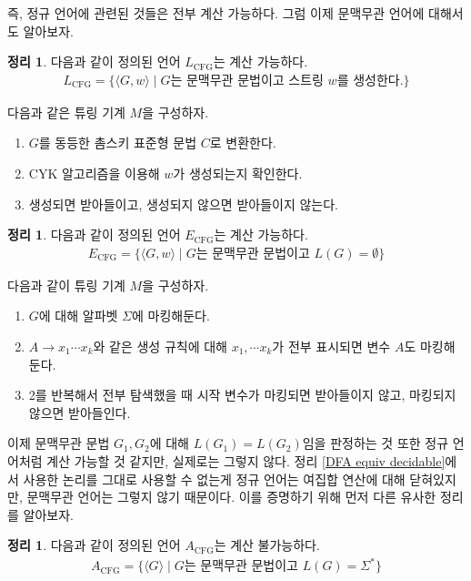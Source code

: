 \documentclass[b5paper, 10pt]{book}
\theoremstyle{definition}
\newtheorem{thm}[defn]{정리}
\newenvironment{pf*}{\pushQED{\qed}\pf}{\popQED\endpf}
\begin{document}
즉, 정규 언어에 관련된 것들은 전부 계산 가능하다. 그럼 이제 문맥무관 언어에 대해서도
알아보자.
\begin{thm}
    다음과 같이 정의된 언어 $L_{\text{CFG}}$는 계산 가능하다.
    \begin{align*}
        L_{\text{CFG}} = \{\langle G, w \rangle \;\vert\; 
        G\text{는 문맥무관 문법이고 스트링 } w\text{를 생성한다.}\}
    \end{align*}
\end{thm}
\begin{pf*}
    다음과 같은 튜링 기계 $M$을 구성하자.
    \begin{enumerate}
        \item $G$를 동등한 촘스키 표준형 문법 $C$로 변환한다.
        \item CYK 알고리즘을 이용해 $w$가 생성되는지 확인한다.
        \item 생성되면 받아들이고, 생성되지 않으면 받아들이지 않는다.
    \end{enumerate}
\end{pf*}
\begin{thm}
    다음과 같이 정의된 언어 $E_\text{CFG}$는 계산 가능하다.
    \begin{align*}
        E_{\text{CFG}} = \{\langle G, w \rangle \;\vert\; 
        G\text{는 문맥무관 문법이고 } L(G) = \emptyset\}
    \end{align*}
\end{thm}
\begin{pf*}
    다음과 같이 튜링 기계 $M$을 구성하자.
    \begin{enumerate}
        \item $G$에 대해 알파벳 $\Sigma$에 마킹해둔다. 
        \item $A \rightarrow x_1 \cdots x_k$와 같은 생성 규칙에 대해 
        $x_1, \cdots x_k$가 전부 표시되면 변수 $A$도 마킹해둔다.
        \item 2를 반복해서 전부 탐색했을 때 시작 변수가 마킹되면 받아들이지 않고, 
        마킹되지 않으면 받아들인다. 
    \end{enumerate}
\end{pf*}
이제 문맥무관 문법 $G_1, G_2$에 대해 $L(G_1) = L(G_2)$임을 판정하는 것 또한
정규 언어처럼 계산 가능할 것 같지만, 실제로는 그렇지 않다. 정리 \ref{DFA equiv decidable}에서
사용한 논리를 그대로 사용할 수 없는게 정규 언어는 여집합 연산에 대해 닫혀있지만, 문맥무관 언어는
그렇지 않기 때문이다. 이를 증명하기 위해 먼저 다른 유사한 정리를 알아보자.
\begin{thm}
    \label{all CFG undecidable}
    다음과 같이 정의된 언어 $A_\text{CFG}$는 계산 불가능하다.
    \begin{align*}
        A_\text{CFG} = \{\langle G \rangle \;\vert\; G\text{는 문맥무관 문법이고 } L(G) = \Sigma^*\}
    \end{align*}
\end{thm}
\end{document}
